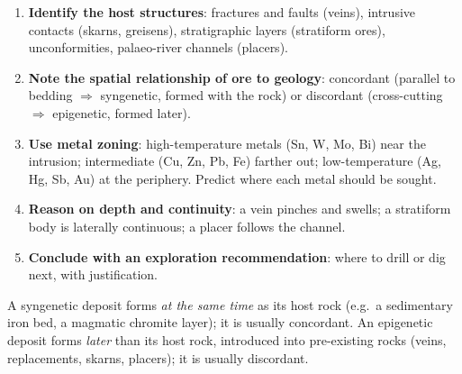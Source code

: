 \documentclass[11pt]{article}
\newcommand{\cle}[1]{{\popxbold\color{popdark}#1}}
\begin{document}
\begin{methode}
\begin{enumerate}
\item \textbf{Identify the host structures}: fractures and faults (veins), intrusive contacts (skarns, greisens), stratigraphic layers (stratiform ores), unconformities, palaeo-river channels (placers).
\item \textbf{Note the spatial relationship of ore to geology}: concordant (parallel to bedding $\Rightarrow$ syngenetic, formed with the rock) or discordant (cross-cutting $\Rightarrow$ epigenetic, formed later).
\item \textbf{Use metal zoning}: high-temperature metals (Sn, W, Mo, Bi) near the intrusion; intermediate (Cu, Zn, Pb, Fe) farther out; low-temperature (Ag, Hg, Sb, Au) at the periphery. Predict where each metal should be sought.
\item \textbf{Reason on depth and continuity}: a vein pinches and swells; a stratiform body is laterally continuous; a placer follows the channel.
\item \textbf{Conclude with an exploration recommendation}: where to drill or dig next, with justification.
\end{enumerate}
\end{methode}

\begin{definition}
A \cle{syngenetic} deposit forms \emph{at the same time} as its host rock (e.g.\ a sedimentary iron bed, a magmatic chromite layer); it is usually concordant. An \cle{epigenetic} deposit forms \emph{later} than its host rock, introduced into pre-existing rocks (veins, replacements, skarns, placers); it is usually discordant.
\end{definition}
\end{document}
